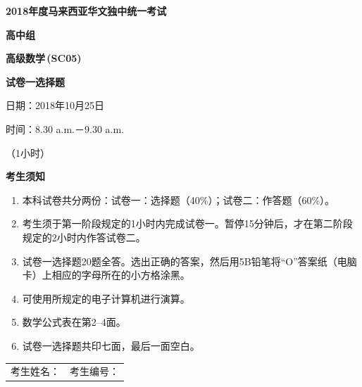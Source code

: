 \documentclass[12pt,a4paper]{exam-zh}
\newcommand{\papertitleone}{2018年度马来西亚华文独中统一考试}
\newcommand{\papersubject}{高级数学\,(SC05)}
\begin{document}
\begin{center}
  {\bfseries \papertitleone\par}
  \vspace{1.3em}
  {\bfseries 高中组\par}
  \vspace{1.2em}
  {\bfseries \papersubject\par}
  \vspace{1.2em}
  {\bfseries 试卷一\quad 选择题\par}
  \vspace{0.8em}
  日期：2018年10月25日\par
  时间：8.30 a.m.－9.30 a.m.\par
  （1小时）
\end{center}

\vspace{1.5em}
{\bfseries 考生须知}
\begin{enumerate}[label=（\arabic*）,leftmargin=2.6em,itemsep=0.7em]
  \item 本科试卷共分两份：试卷一：选择题（40\%）；试卷二：作答题（60\%）。
  \item 考生须于第一阶段规定的1小时内完成试卷一。暂停15分钟后，才在第二阶段规定的2小时内作答试卷二。
  \item 试卷一选择题20题全答。选出正确的答案，然后用5B铅笔将“O”答案纸（电脑卡）上相应的字母所在的小方格涂黑。
  \item 可使用所规定的电子计算机进行演算。
  \item 数学公式表在第2--4面。
  \item 试卷一选择题共印七面，最后一面空白。
\end{enumerate}

\vfill
\begin{center}
  \fbox{\rule{0pt}{1.1em}\hspace{1em}{\bfseries 未经正式宣布\quad 不得翻看内页}\hspace{1em}}
\end{center}

\vspace{1.5em}
\begin{tabular*}{\linewidth}{@{\extracolsep{\fill}}ll}
考生姓名：\underline{\hspace{5cm}} & 考生编号：\underline{\hspace{4cm}}
\end{tabular*}

\newpage
\end{document}
